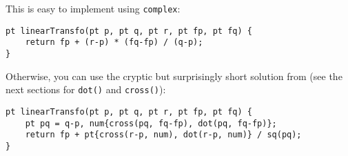 
This is easy to implement using \lstinline|complex|:
\begin{lstlisting}
pt linearTransfo(pt p, pt q, pt r, pt fp, pt fq) {
    return fp + (r-p) * (fq-fp) / (q-p);
}
\end{lstlisting}

Otherwise, you can use the cryptic but surprisingly short solution from \cite{kactl} (see the next sections for \lstinline|dot()| and \lstinline|cross()|):
\begin{lstlisting}
pt linearTransfo(pt p, pt q, pt r, pt fp, pt fq) {
    pt pq = q-p, num{cross(pq, fq-fp), dot(pq, fq-fp)};
    return fp + pt{cross(r-p, num), dot(r-p, num)} / sq(pq);
}
\end{lstlisting}
